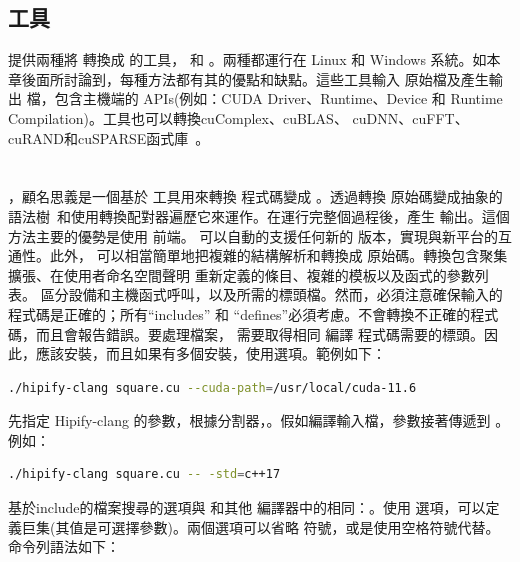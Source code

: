 \subsection{工具}

 提供兩種將  轉換成  的工具， 和 。兩種都運行在 Linux 和 Windows 系統。如本章後面所討論到，每種方法都有其的優點和缺點。這些工具輸入  原始檔及產生輸出  檔，包含主機端的 APIs(例如：CUDA Driver、Runtime、Device 和 Runtime Compilation)。工具也可以轉換cuComplex、cuBLAS、 cuDNN、cuFFT、cuRAND和cuSPARSE函式庫~\cite{HIP-Supported-API}。
\\ \\ 
\\ ，顧名思義是一個基於  工具用來轉換  程式碼變成 。透過轉換  原始碼變成抽象的語法樹~\cite{Abstract-Syntax-Tree}和使用轉換配對器遍歷它來運作。在運行完整個過程後，產生  輸出。這個方法主要的優勢是使用  前端。 可以自動的支援任何新的  版本，實現與新平台的互通性。此外，  可以相當簡單地把複雜的結構解析和轉換成  原始碼。轉換包含聚集擴張、在使用者命名空間聲明  重新定義的條目、複雜的模板以及函式的參數列表。 區分設備和主機函式呼叫，以及所需的標頭檔。然而，必須注意確保輸入的  程式碼是正確的；所有“includes” 和 “defines”必須考慮。不會轉換不正確的程式碼，而且會報告錯誤。要處理檔案， 需要取得相同  編譯  程式碼需要的標頭。因此，應該安裝，而且如果有多個安裝，使用選項。範例如下：

\begin{lstlisting}[language=bash]
./hipify-clang square.cu --cuda-path=/usr/local/cuda-11.6
\end{lstlisting}

先指定 Hipify-clang 的參數，根據分割器，。假如編譯輸入檔，參數接著傳遞到 。例如：

\begin{lstlisting}[language=bash]
./hipify-clang square.cu -- -std=c++17
\end{lstlisting}

基於include的檔案搜尋的選項與  和其他 編譯器中的相同：。使用  選項，可以定義巨集(其值是可選擇參數)。兩個選項可以省略  符號，或是使用空格符號代替。命令列語法如下：

